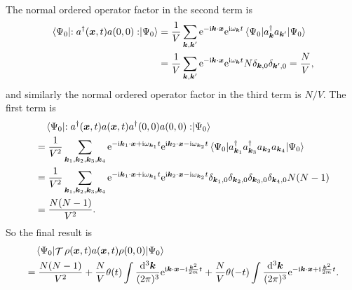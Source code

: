 \documentclass[hyperref, a4paper]{article}
\DeclareMathOperator{\timeorder}{\mathcal{T}}
\newcommand*{\ii}{\mathrm{i}}
\newcommand*{\ee}{\mathrm{e}}
\newcommand*{\normalorder}[1]{: #1 :}
\begin{document}
\begin{enumerate}
\begin{equation}
\begin{aligned}
    \end{aligned}
\end{equation}
The normal ordered operator factor in the second term is 
\[
    \begin{aligned}
        \expval{\normalorder{a^\dagger(\vb*{x}, t) a(0, 0)}}{\Psi_0} &= 
        \frac{1}{V} \sum_{\vb*{k}, \vb*{k}'} \ee^{- \ii \vb*{k} \cdot \vb*{x}} \ee^{\ii \omega_{\vb*{k}} t}
        \expval{a^\dagger_{\vb*{k}} a_{\vb*{k}'}}{\Psi_0}  \\
        &= \frac{1}{V} \sum_{\vb*{k}, \vb*{k}'} \ee^{- \ii \vb*{k} \cdot \vb*{x}} \ee^{\ii \omega_{\vb*{k}} t}
        N \delta_{\vb*{k}, 0} \delta_{\vb*{k}', 0} = \frac{N}{V},
    \end{aligned}
\]
and similarly the normal ordered operator factor in the third term is $N / V$.
The first term is 
\[
    \begin{aligned}
        &\quad \expval{\normalorder{a^\dagger(\vb*{x}, t) a(\vb*{x}, t) a^\dagger(0, 0) a(0, 0)}}{\Psi_0}  \\
        &= \frac{1}{V^2} \sum_{\vb*{k}_1, \vb*{k}_2, \vb*{k}_3, \vb*{k}_4} 
        \ee^{- \ii \vb*{k}_1 \cdot \vb*{x} + \ii \omega_{\vb*{k}_1} t} 
        \ee^{  \ii \vb*{k}_2 \cdot \vb*{x} - \ii \omega_{\vb*{k}_2} t} 
        \expval{a^\dagger_{\vb*{k}_1} a^\dagger_{\vb*{k}_3} a_{\vb*{k}_2} a_{\vb*{k}_4} }{\Psi_0} \\
        &= \frac{1}{V^2} \sum_{\vb*{k}_1, \vb*{k}_2, \vb*{k}_3, \vb*{k}_4} 
        \ee^{- \ii \vb*{k}_1 \cdot \vb*{x} + \ii \omega_{\vb*{k}_1} t} 
        \ee^{  \ii \vb*{k}_2 \cdot \vb*{x} - \ii \omega_{\vb*{k}_2} t} 
        \delta_{\vb*{k}_1, 0} \delta_{\vb*{k}_2, 0} \delta_{\vb*{k}_3, 0} \delta_{\vb*{k}_4, 0} N(N-1) \\
        &= \frac{N(N-1)}{V^2}.
    \end{aligned}
\]
So the final result is 
\begin{equation}
    \begin{aligned}
        &\quad \expval{\timeorder \rho(\vb*{x}, t) a(\vb*{x}, t) \rho(0, 0)}{\Psi_0} \\
        &= \frac{N(N-1)}{V^2} + 
        \frac{N}{V} \theta(t) \int \frac{\dd[3]{\vb*{k}}}{(2\pi)^3} 
        \ee^{ \ii \vb*{k} \cdot \vb*{x} - \ii \frac{\vb*{k}^2}{2m} t } + 
        \frac{N}{V} \theta(- t) \int \frac{\dd[3]{\vb*{k}}}{(2\pi)^3} 
        \ee^{- \ii \vb*{k} \cdot \vb*{x} + \ii \frac{\vb*{k}^2}{2m} t } .
    \end{aligned}
    \label{eq:original-density-density}
\end{equation}


\end{enumerate}
\end{document}

